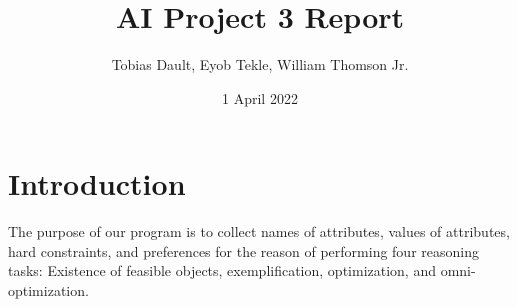 \documentclass[11pt]{article}
\title{\textbf{AI Project 3 Report}}
\author{Tobias Dault, Eyob Tekle, William Thomson Jr.}
\date{1 April 2022}
\begin{document}
\maketitle
\thispagestyle{empty}

\section{Introduction}
The purpose of our program is to collect names of attributes, values of attributes, hard constraints, and preferences for the reason of performing four reasoning tasks: Existence of feasible objects, exemplification, optimization, and omni-optimization.
\\\\\\\\\\\\
\end{document}
